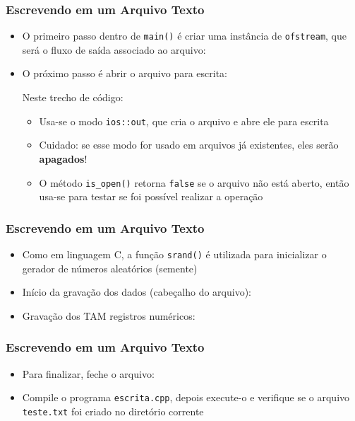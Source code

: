\documentclass[aspectratio=169]{beamer}
\begin{document}
\begin{frame}[fragile]\frametitle{Escrevendo em um Arquivo Texto}
\begin{itemize}
	\item O primeiro passo dentro de \texttt{main()} é criar uma instância de \texttt{ofstream}, que será o fluxo de saída associado ao arquivo:

	\item O próximo passo é abrir o arquivo para escrita:

Neste trecho de código:
	\begin{itemize}
		\item Usa-se o modo \texttt{ios::out}, que cria o arquivo e abre ele para escrita
		\item Cuidado: se esse modo for usado em arquivos já existentes, eles serão \textbf{apagados}!
		\item O método \texttt{is\_open()} retorna \texttt{false} se o arquivo não está aberto, então usa-se para testar se foi possível realizar a operação
	\end{itemize}
\end{itemize}
\end{frame}

\begin{frame}[fragile]\frametitle{Escrevendo em um Arquivo Texto}
\begin{itemize}
	\item Como em linguagem C, a função \texttt{srand()} é utilizada para inicializar o gerador de números aleatórios (semente)

	\item Início da gravação dos dados (cabeçalho do arquivo):

	\item Gravação dos TAM registros numéricos:

\end{itemize}
\end{frame}

\begin{frame}[fragile]\frametitle{Escrevendo em um Arquivo Texto}
\begin{itemize}
	\item Para finalizar, feche o arquivo:

	\item Compile o programa \texttt{escrita.cpp}, depois execute-o e verifique se o arquivo \texttt{teste.txt} foi criado no diretório corrente
\end{itemize}
\end{frame}
\end{document}
